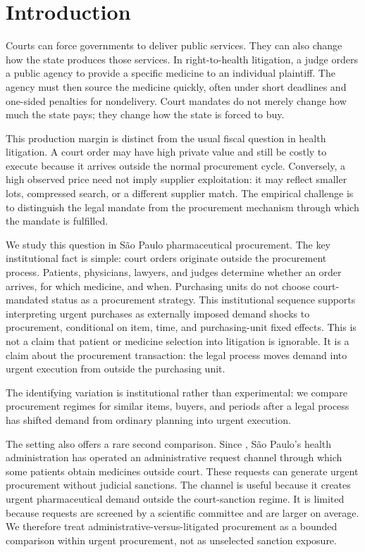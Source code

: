 \section{Introduction}
\label{sec:introduction}

Courts can force governments to deliver public services. They can
also change how the state produces those services. In right-to-health
litigation, a judge orders a public agency to provide a specific
medicine to an individual plaintiff. The agency must then source the
medicine quickly, often under short deadlines and one-sided penalties
for nondelivery. Court mandates do not merely change how much the
state pays; they change how the state is forced to buy.

This production margin is distinct from the usual fiscal question in
health litigation. A court order may have high private value and still
be costly to execute because it arrives outside the normal procurement
cycle. Conversely, a high observed price need not imply supplier
exploitation: it may reflect smaller lots, compressed search, or a
different supplier match. The empirical challenge is to distinguish
the legal mandate from the procurement mechanism through which the
mandate is fulfilled.

We study this question in S\~ao Paulo pharmaceutical procurement. The
key institutional fact is simple: court orders originate outside the
procurement process. Patients, physicians, lawyers, and judges
determine whether an order arrives, for which medicine, and when.
Purchasing units do not choose court-mandated status as a procurement
strategy. This institutional sequence supports interpreting urgent
purchases as externally imposed demand shocks to procurement,
conditional on item, time, and purchasing-unit fixed effects. This is
not a claim that patient or medicine selection into litigation is
ignorable. It is a claim about the procurement
transaction: the legal process moves demand into urgent execution from
outside the purchasing unit.

The identifying variation is institutional rather than experimental:
we compare procurement regimes for similar items, buyers, and periods
after a legal process has shifted demand from ordinary planning into
urgent execution.

The setting also offers a rare second comparison. Since
\BPsampleStartYear{}, S\~ao Paulo's health administration has operated
an administrative request channel through which some patients obtain
medicines outside court. These requests can generate urgent
procurement without judicial sanctions. The channel is useful because
it creates urgent pharmaceutical demand outside the court-sanction
regime. It is limited because requests are screened by a scientific
committee and are larger on average. We therefore treat
administrative-versus-litigated procurement as a bounded comparison
within urgent procurement, not as unselected sanction exposure.

